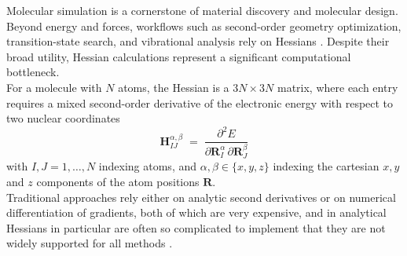 \documentclass[pdflatex,sn-mathphys-num]{sn-jnl}%
\theoremstyle{thmstyleone}%
\theoremstyle{thmstyletwo}%
\theoremstyle{thmstylethree}%
\begin{document}
Molecular simulation is a cornerstone of material discovery and molecular design. Beyond energy and forces, workflows such as second-order geometry optimization, transition-state search, and vibrational analysis rely on Hessians \citep{qu2016,huang2018}. 
Despite their broad utility, Hessian calculations represent a significant computational bottleneck.\\
For a molecule with $N$ atoms, the Hessian is a $3N \times 3N$ matrix, where each entry requires a mixed second-order derivative of the electronic energy with respect to two nuclear coordinates
\begin{equation}
\mathbf{H}_{IJ}^{\alpha,\beta}\;=\;\frac{\partial^2 E}{\partial \mathbf{R}_I^{\alpha}\,\partial \mathbf{R}_J^{\beta}}
\end{equation}
with $I,J=1,\dots,N$ indexing atoms, and $\alpha,\beta\in\{x,y,z\}$ indexing the cartesian $x,y$ and $z$ components of the atom positions $\mathbf{R}$. \\
Traditional approaches rely either on analytic second derivatives or on numerical differentiation of gradients, both of which are very expensive, and in analytical Hessians in particular are often so complicated to implement that they are not widely supported for all methods \citep{jorgensen1983,handy1984,komornicki1993}.
\end{document}
